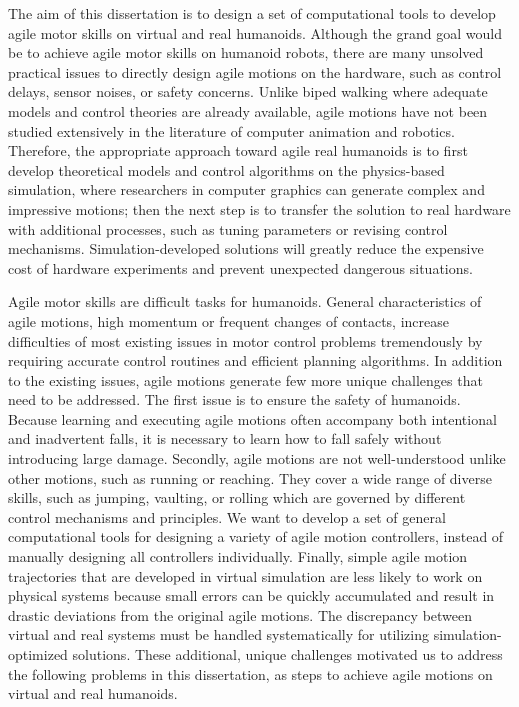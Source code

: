 The aim of this dissertation is to design a set of computational tools to
develop agile motor skills on virtual and real humanoids.
Although the grand goal would be to achieve agile motor skills on humanoid
robots, there are many unsolved practical issues to directly
design agile motions on the hardware,
such as control delays, sensor noises, or safety concerns.
Unlike biped walking where adequate models and control theories are
already available, agile motions have not been studied extensively in the
literature of computer animation and robotics.
Therefore, the appropriate approach toward agile real humanoids is to first
develop theoretical models and control algorithms on the physics-based
simulation, where researchers in computer graphics can
generate complex and impressive motions;
then the next step is to transfer the solution to real hardware
with additional processes, such as tuning parameters
or revising control mechanisms.
Simulation-developed solutions will
greatly reduce the expensive cost of hardware experiments and prevent
unexpected dangerous situations.

Agile motor skills are difficult tasks for humanoids.
General characteristics of agile motions, high momentum or frequent changes
of contacts, increase difficulties of most existing issues in motor control
problems tremendously
by requiring accurate control routines and efficient planning algorithms.
In addition to the existing issues, agile motions generate few more unique
challenges that need to be addressed. 
The first issue is to ensure the safety of humanoids.
Because learning and executing agile motions often accompany both intentional
and inadvertent falls, it is necessary to learn how to fall safely without
introducing large damage.
Secondly, agile motions are not well-understood unlike other motions,
such as running or reaching.
They cover a wide range of diverse skills, such as jumping, vaulting, or
rolling which are governed by different control mechanisms and principles.
We want to develop a set of general computational tools for designing
a variety of agile motion controllers, instead of manually designing all
controllers individually.  
Finally, simple agile motion trajectories that are developed in virtual
simulation are less likely to work on physical systems
because small errors can be quickly accumulated and result in drastic deviations
from the original agile motions.
The discrepancy between virtual and real systems must be handled
systematically for utilizing simulation-optimized solutions.
These additional, unique challenges motivated us to address the following 
problems in this dissertation, as steps to achieve agile motions 
on virtual and real humanoids.

